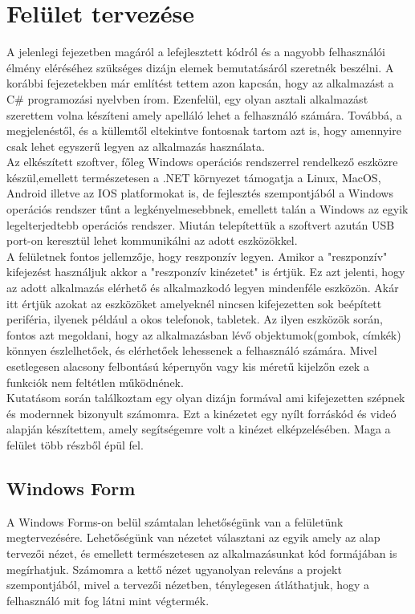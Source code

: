 \documentclass[tocnopagenum]{thesis-ekf}
\theoremstyle{definition}
\theoremstyle{remark}
\begin{document}
	\section{Felület tervezése}
	A jelenlegi fejezetben magáról a lefejlesztett kódról és a nagyobb felhasználói élmény eléréséhez szükséges dizájn elemek bemutatásáról szeretnék beszélni.
	A korábbi fejezetekben már említést tettem azon kapcsán, hogy az alkalmazást a C\# programozási nyelvben írom. Ezenfelül, egy olyan asztali alkalmazást szerettem volna készíteni amely apelláló lehet a felhasználó számára. Továbbá, a megjelenéstől, és a küllemtől eltekintve fontosnak tartom azt is, hogy amennyire csak lehet egyszerű legyen az alkalmazás használata.
	\\
	Az elkészített szoftver, főleg Windows operációs rendszerrel rendelkező eszközre készül,emellett természetesen a .NET környezet támogatja a Linux, MacOS, Android illetve az IOS platformokat is, de fejlesztés szempontjából a Windows operációs rendszer tűnt a legkényelmesebbnek, emellett talán a Windows az egyik legelterjedtebb operációs rendszer. \cite{altexsoft}
	Miután telepítettük a szoftvert azután USB port-on keresztül lehet kommunikálni az adott eszközökkel.
	\\
	A felületnek fontos jellemzője, hogy reszponzív legyen. Amikor a "reszponzív" kifejezést használjuk akkor a "reszponzív kinézetet" is értjük. Ez azt jelenti, hogy az adott alkalmazás elérhető és alkalmazkodó legyen mindenféle eszközön. Akár itt értjük azokat az eszközöket amelyeknél nincsen kifejezetten sok beépített periféria, ilyenek például a okos telefonok, tabletek. Az ilyen eszközök során, fontos azt megoldani, hogy az alkalmazásban lévő objektumok(gombok, címkék) könnyen észlelhetőek, és elérhetőek lehessenek a felhasználó számára. 
	Mivel esetlegesen alacsony felbontású képernyőn vagy kis méretű kijelzőn ezek a funkciók nem feltétlen működnének. 
	\\
	Kutatásom során találkoztam egy olyan dizájn formával ami kifejezetten szépnek és modernnek bizonyult számomra.\cite{modernUI} 
	Ezt a kinézetet egy nyílt forráskód és videó alapján készítettem, amely segítségemre volt a kinézet elképzelésében.
	Maga a felület több részből épül fel. \cite{rjcode}
	\\
	\subsection{Windows Form}
	A Windows Forms-on belül számtalan lehetőségünk van a felületünk  megtervezésére. Lehetőségünk van nézetet választani az egyik amely az alap tervezői nézet, és emellett természetesen az alkalmazásunkat kód formájában is megírhatjuk. Számomra a kettő nézet ugyanolyan releváns a projekt szempontjából, mivel a tervezői nézetben, ténylegesen átláthatjuk, hogy a felhasználó mit fog látni mint végtermék.
	
\end{document}
